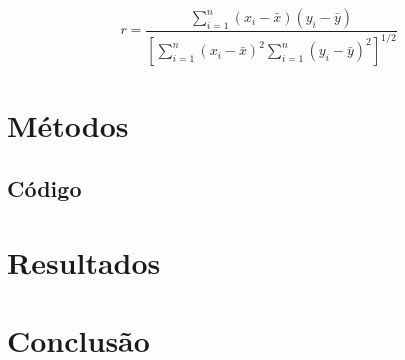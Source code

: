 \documentclass[10pt,a4paper]{article}
\begin{document}
\begin{equation*}r = \frac{  
\displaystyle{\sum_{i=1}^n (x_i-\bar{x})(y_i-  
\bar{y})}}{\displaystyle{\left[  
\sum_{i=1}^n(x_i-\bar{x})^2  
\sum_{i=1}^n(y_i-\bar{y})^2\right]^{1/2}}}  
\end{equation*}  
\section{Métodos}
\subsection{Código}

\section{Resultados}

\section{Conclusão}


\begin{small}
  
\end{small}
\end{document}
